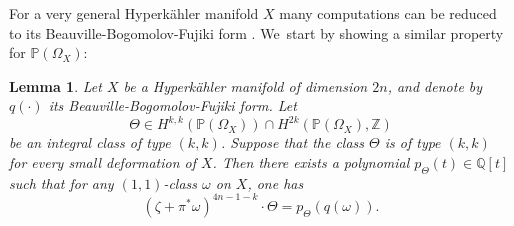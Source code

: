 \documentclass[JEP,XML,SOM,Unicode,NoEqCountersInSection,published]{cedram}
\theoremstyle{plain}
\newtheorem{lemma}[theorem]{Lemma}
\theoremstyle{definition}
\newcommand{\Q}{\ensuremath{\mathbb{Q}}}
\newcommand{\Z}{\ensuremath{\mathbb{Z}}}
\newcommand{\PP}{\ensuremath{\mathbb{P}}}
\begin{document}
For a very general Hyperkähler manifold $X$ many computations can be reduced to its Beauville-Bogomolov-Fujiki form \cite{Huy99}. We~start by showing a similar property for $\PP(\Omega_X)$:

\begin{lemma}\label{lemmakeycomputation}
Let $X$ be a Hyperkähler manifold of dimension $2n$, and denote by $q(\cdot)$ its Beauville-Bogomolov-Fujiki form.
Let
\[
\Theta \in
H^{k,k}(\PP(\Omega_X))\cap H^{2k}(\PP(\Omega_X),\Z)
\]
be an integral class of type $(k,k)$. Suppose that the class $\Theta$ is of type $(k,k)$ for every small deformation
of $X$.
Then there exists a polynomial
$p_\Theta(t) \in \Q[t]$ such that for any $(1,1)$-class $\omega$ on $X$, one has
\[
(\zeta + \pi^* \omega)^{4n-1-k} \cdot \Theta = p_\Theta(q(\omega)).
\]
\end{lemma}
\end{document}

